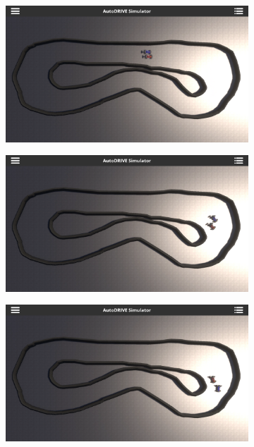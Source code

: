 \documentclass[letterpaper, 10 pt, conference]{ieeeconf}  %
\begin{document}
	\begin{figure}[t]
		\centering
		\begin{subfigure}[b]{0.16\linewidth}
			\centering
			\includegraphics[width=\linewidth]{Fig10a.png}
			\caption{}
			\label{fig10a}
		\end{subfigure}
		\hfill
		\begin{subfigure}[b]{0.16\linewidth}
			\centering
			\includegraphics[width=\linewidth]{Fig10b.png}
			\caption{}
			\label{fig10b}
		\end{subfigure}
		\hfill
		\begin{subfigure}[b]{0.16\linewidth}
			\centering
			\includegraphics[width=\linewidth]{Fig10c.png}

\end{subfigure}
\end{figure}
\end{document}
